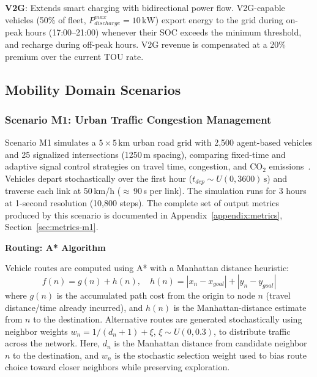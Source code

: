 \textbf{V2G}: Extends smart charging with bidirectional power flow. V2G-capable vehicles (50\% of fleet, $P_{discharge}^{max} = 10\,\text{kW}$) export energy to the grid during on-peak hours (17:00--21:00) whenever their SOC exceeds the minimum threshold, and recharge during off-peak hours. V2G revenue is compensated at a 20\% premium over the current TOU rate.


\subsection{Mobility Domain Scenarios}

\subsubsection{Scenario M1: Urban Traffic Congestion Management}
\label{sec:scenario-m1}

Scenario M1 simulates a $5 \times 5\,\text{km}$ urban road grid with 2,500 agent-based vehicles and 25 signalized intersections (1250\,m spacing), comparing fixed-time and adaptive signal control strategies on travel time, congestion, and CO$_2$ emissions~\cite{mobility_challenges, agent_traffic_overview}. Vehicles depart stochastically over the first hour ($t_{dep} \sim U(0, 3600)\,\text{s}$) and traverse each link at 50\,km/h ($\approx$\,90\,s per link). The simulation runs for 3 hours at 1-second resolution (10,800 steps). The complete set of output metrics produced by this scenario is documented in Appendix~\ref{appendix:metrics}, Section~\ref{sec:metrics-m1}.

\medskip\noindent\textbf{Routing: A* Algorithm}

Vehicle routes are computed using A* with a Manhattan distance heuristic:
\begin{equation}
f(n) = g(n) + h(n), \quad h(n) = |x_n - x_{goal}| + |y_n - y_{goal}|
\label{eq:astar}
\end{equation}
where $g(n)$ is the accumulated path cost from the origin to node $n$ (travel distance/time already incurred), and $h(n)$ is the Manhattan-distance estimate from $n$ to the destination.
Alternative routes are generated stochastically using neighbor weights $w_n = 1/(d_n + 1) + \xi$, $\xi \sim U(0, 0.3)$, to distribute traffic across the network.
Here, $d_n$ is the Manhattan distance from candidate neighbor $n$ to the destination, and $w_n$ is the stochastic selection weight used to bias route choice toward closer neighbors while preserving exploration.

